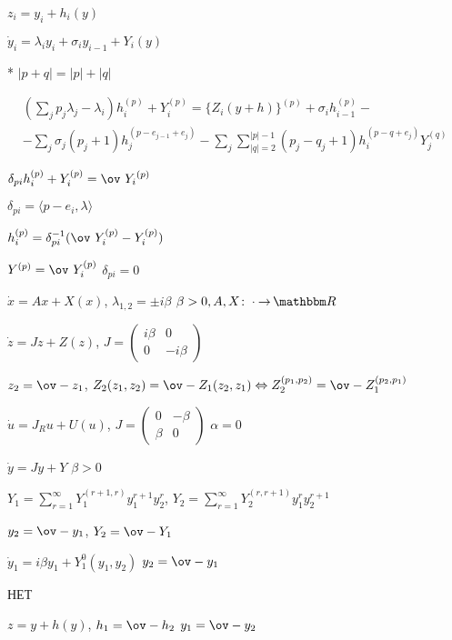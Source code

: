 \documentclass[hardcopy]{longnotes}
\begin{document}
\begin{list}
  \item $z_i = y_i + h_i(y)$
  \item $\dot y_i = \lambda_i y_i + \sigma_i y_{i-1} + Y_i(y)$
  \item [*] $|p +q| = |p| + |q|$ \hfill{\flame}
  \item $\begin{aligned}
      &\left(\sum_j p_j \lambda_j - \lambda_i\right) h_i^{(p)} + Y_i^{(p)} 
      =  \bigl\{Z_i(y + h) \bigr\}^{(p)} + \sigma_i h_{i-1}^{(p)} - \\ 
      &- \sum_j \sigma_j (p_j + 1) h_j ^{(p-e_{j-1}+e_j)} 
      - \sum_j \sum\limits_{|q|=2}^{|p|-1}(p_j - q_j +1) h_i^{(p-q+e_j)} Y_j^{(q)} 
    \end{aligned}$
  \item $\delta_{pi}h_i ^{(p)} + Y_i^{(p)} = \ov~{Y_i}^{(p)}$
  \item $\delta_{pi} = \langle p-e_i, \lambda \rangle$
  \item $h_i^{(p)} = \delta_{pi}^{-1} (\ov~{Y}_i^{(p)} - Y_i ^{(p)})$
  \item $Y^{(p)} = \ov~{Y}_i^{(p)}$ \hfill $\delta_{pi}= 0$
  \item $\dot x = Ax + X(x)$, $\lambda_{1,2} = \pm i \beta$ \hfill $\beta >0, A,X\colon\cdot\to\R$
  \item $\dot z= Jz + Z(z)$, $J = \left(\begin{matrix}
      i \beta & 0 \\ 0& -i \beta
  \end{matrix}\right)
  $
  \item $z_2 = \ov- z_1$, 
    $Z_2(z_1, z_2) = \ov-{Z}_1 (z_2, z_1) \Leftrightarrow Z_2^{(p_1,p_2)} = \ov-Z_1^{(p_2, p_1)}$
  \item $\dot u = J_R u + U(u)$,
    $J = \left(
      \begin{matrix}
        0 & -\beta \\ \beta & 0 
      \end{matrix}
    \right)$ \hfill $\alpha = 0$
  \item $\dot y = Jy+Y$ \hfill $\beta >0$
  \item $Y_1 = \sum_{r=1}^\infty Y_1^{(r+1,r)} y_1^{r+1} y_2 ^{r}$, \quad 
    $Y_2 = \sum_{r=1}^\infty Y_2^{(r,r+1)} y_1^{r} y_2 ^{r+1}$
  \item $y_2 = \ov-y_1$, $Y_2 = \ov-Y_1$
  \item $\dot y_1 = i \beta y_1 + Y_1^0 (y_1,y_2)$ \hfill $y_2 = \ov-y_1$
  \item НЕТ
  \item $z=y + h(y)$, $h_1 = \ov-h_2$ \hfill $y_1 = \ov- y_2$

\end{list}
\end{document}
